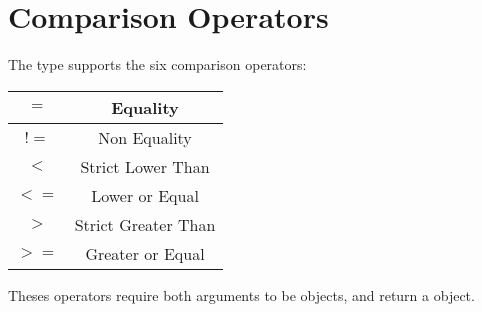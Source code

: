 \section{Comparison Operators}

The  type supports the six comparison operators:

\begin{tabular}{|c|c|}
\hline
$=$ & Equality \\
\hline
$!=$ & Non Equality \\
\hline
$<$  & Strict Lower Than \\
\hline
$<=$  & Lower or Equal \\
\hline
$>$  & Strict Greater Than \\
\hline
$>=$  & Greater or Equal \\
\hline
\end{tabular}

Theses operators require both arguments to be  objects, and return a  object.
